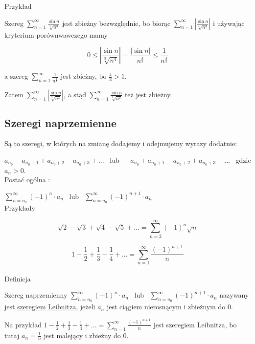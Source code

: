 Przykład 

Szereg $ \sum\limits_{n=1}^{\infty} \frac{\sin n}{\sqrt[3]{n^4}} $ jest zbieżny bezwzględnie, bo biorąc
$ \sum\limits_{n=1}^{\infty} \left| \frac{\sin n}{\sqrt[3]{n^4}} \right| $ i używając kryterium porównwawczego mamy

$$ 0 \leq \left| \frac{\sin n}{\sqrt[3]{n^4}} \right| = \frac{|\sin n|}{n^{\frac{4}{3}}} \leq \frac{1}{n^{\frac{4}{3}}} $$

a szereg $ \sum\limits_{n=1}^{\infty} \frac{1}{n^{\frac{4}{3}}} $ jest zbieżny, bo $ \frac{4}{3} > 1 $. 

Zatem
$ \sum\limits_{n=1}^{\infty} \left| \frac{\sin n}{\sqrt[3]{n^4}} \right| $, a stąd
$\sum\limits_{n=1}^{\infty} \frac{\sin n}{\sqrt[3]{n^4}}$ też jest zbieżny.


\subsection*{Szeregi naprzemienne}

Są to szeregi, w których na zmianę dodajemy i odejmujemy wyrazy dodatnie:

$ a_{n_0} - a_{n_0 + 1} + a_{n_0 + 2} - a_{n_0 + 3} + ... $ \ lub \ $ -a_{n_0} + a_{n_0 + 1} - a_{n_0 + 2} + a_{n_0 + 3} + ...  $ \
gdzie $a_n > 0$. \\

Postać ogólna :

$ \sum\limits_{n = n_0}^{\infty} (-1)^n \cdot a_n $ \ lub \ $ \sum\limits_{n = n_0}^{\infty} (-1)^{n+1} \cdot a_n $ \\

Przykłady

$$ \sqrt{2} - \sqrt{3} + \sqrt{4} - \sqrt{5} + ... = \sum\limits_{n=2}^{\infty} (-1)^n \sqrt{n} $$

$$ 1 - \frac{1}{2} + \frac{1}{3} - \frac{1}{4} + ... = \sum\limits_{n=1}^{\infty} \frac{(-1)^{n+1}}{n} $$ \\

Definicja

Szereg naprzemienny $ \sum\limits_{n = n_0}^{\infty} (-1)^n \cdot a_n $ \ lub \ $ \sum\limits_{n = n_0}^{\infty} (-1)^{n+1} \cdot a_n $
nazywany jest \underline{szeregiem Leibnitza}, jeżeli $a_n$ jest ciągiem nierosnącym i zbieżnym do 0.

Na przykład $ 1 - \frac{1}{2} + \frac{1}{3} - \frac{1}{4} + ... = \sum\limits_{n=1}^{\infty} \frac{(-1)^{n+1}}{n} $
jest szeregiem Leibnitza, bo tutaj $ a_n = \frac{1}{n} $ jest malejący i zbieżny do 0. \\

